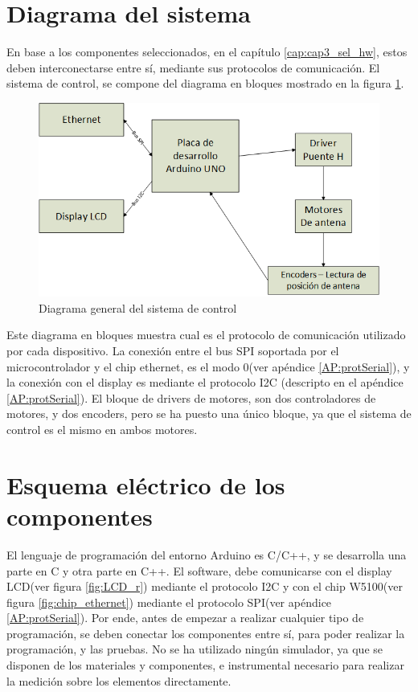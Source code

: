 \section{Diagrama del sistema} 

En base a los componentes seleccionados, en el capítulo \ref{cap:cap3_sel_hw}, estos deben interconectarse entre sí, mediante sus protocolos de comunicación. El sistema de control, se compone del diagrama en bloques mostrado en la figura \ref{fig:sistema_general}.  
\begin{figure}[ht]
	\hspace{-15mm}
	\includegraphics{sistema_general} 
	\caption{Diagrama general del sistema de control} 
	\label{fig:sistema_general}
\end{figure}

Este diagrama en bloques muestra cual es el protocolo de comunicación utilizado por cada dispositivo. La conexión entre el bus SPI soportada por el microcontrolador y el chip ethernet, es el modo 0(ver apéndice \ref{AP:protSerial}), y la conexión con el display es mediante el protocolo I2C (descripto en el apéndice \ref{AP:protSerial}). El bloque de drivers de motores, son dos controladores de motores, y dos encoders, pero se ha puesto una único bloque, ya que el sistema de control es el mismo en ambos motores. 

\section{Esquema eléctrico de los componentes}
El lenguaje de programación del entorno Arduino es C/C++, y se desarrolla una parte en C y otra parte en C++. El software, debe comunicarse con el display LCD(ver figura \ref{fig:LCD_r}) mediante el protocolo I2C y con el chip W5100(ver figura \ref{fig:chip_ethernet}) mediante el protocolo SPI(ver apéndice \ref{AP:protSerial}). Por ende, antes de empezar a realizar cualquier tipo de programación, se deben conectar los componentes entre sí, para poder realizar la programación, y las pruebas. No se ha utilizado ningún simulador, ya que se disponen de los materiales y componentes, e instrumental necesario para realizar la medición sobre los elementos directamente.  

